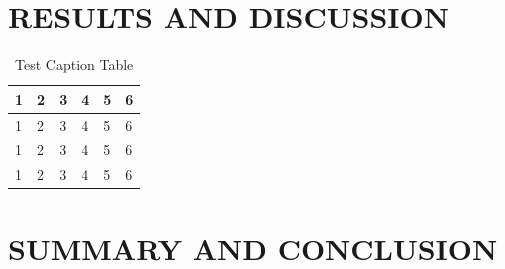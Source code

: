 \documentclass{icsthesis}
\begin{document}
\begin{mainmatter}
			\lipsum
		
		\section{RESULTS AND DISCUSSION}
			\lipsum[4]
			
			\begin{table}[ht]
			\vspace{4ex}
			\centering
				\caption{Test Caption Table}
				
				\label{table:Test Caption Table}
				\begin{tabular}{llllll}
				\hline
				\hline
				1 & 2 & 3 & 4 & 5 & 6 \\ \hline
				1 & 2 & 3 & 4 & 5 & 6 \\
				1 & 2 & 3 & 4 & 5 & 6 \\
				1 & 2 & 3 & 4 & 5 & 6 \\ \hline\hline
				\end{tabular} 
			\vspace{4ex}
			\end{table}
			
			\lipsum[4-10]
			\lipsum[5]
		
		\section{SUMMARY AND CONCLUSION}
			\lipsum[4]
		
			
	\end{mainmatter}
\end{document}
